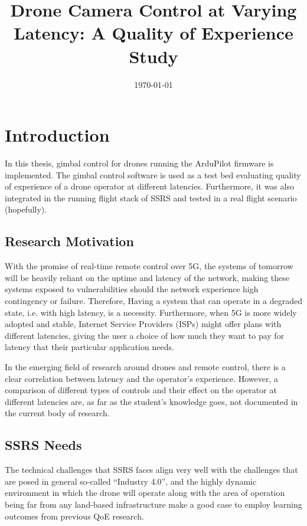 \documentclass[nofilelist]{cslthse-msc}
\title{Drone Camera Control at Varying Latency: A Quality of Experience Study}
\date{\today}
\begin{document}
\renewcommand{\bibname}{References}

\makefrontmatter
\chapter{Introduction}
In this thesis, gimbal control for drones running the ArduPilot firmware is implemented. The gimbal control software is used as a test bed evaluating quality of experience of a drone operator at different latencies. Furthermore, it was also integrated in the running flight stack of SSRS and tested in a real flight scenario (hopefully). 


\section{Research Motivation}
With the promise of real-time remote control over 5G, the systems of tomorrow will be heavily reliant on the uptime and latency of the network, making these systems exposed to vulnerabilities should the network experience high contingency or failure. Therefore, Having a system that can operate in a degraded state, i.e. with high latency, is a necessity. Furthermore, when 5G is more widely adopted and stable, Internet Service Providers (ISPs) might offer plans with different latencies, giving the user a choice of how much they want to pay for latency that their particular application needs.  

In the emerging field of research around drones and remote control, there is a clear correlation between latency and the operator’s experience. However, a comparison of different types of controls and their effect on the operator at different latencies are, as far as the student’s knowledge goes, not documented in the current body of research. 

\section{SSRS Needs}
The technical challenges that SSRS faces align very well with the challenges that are posed in general so-called “Industry 4.0”, and the highly dynamic environment in which the drone will operate along with the area of operation being far from any land-based infrastructure make a good case to employ learning outcomes from previous QoE research. 
\end{document}
